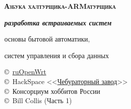 \begin{titlepage}
\vspace{1.5cm}

\begin{centering}

{\Huge \textbf{\textsc{Азбука халтурщика-ARMатурщика}}}

{\Huge \textbf{\textit{разработка встраиваемых систем}}}

{\Large 
основы бытовой автоматики,

систем управления и сбора данных
}

\end{centering}

\vspace{1cm}

{\large
\noindent
\copyright\
\href{https://groups.google.com/forum/\#!forum/openwrt2ru}{ruOpenWrt}
\\
\copyright\ HackSpace
<<\href{https://github.com/ponyatov/CHBZ/raw/master/presentation.pdf}{Чебураторный
завод}>>
\\
\copyright\ Консорциум хоббитов России
\\
\copyright\ Bill Collis (Часть 1)
}
\end{titlepage}
